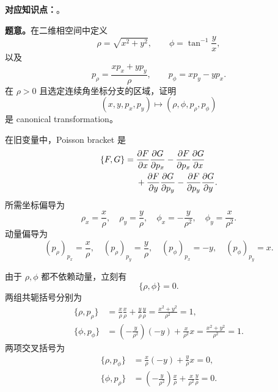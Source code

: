 \textbf{对应知识点：}。

\textbf{题意。}在二维相空间中定义
\begin{equation}
  \rho=\sqrt{x^2+y^2},
  \qquad
  \phi=\tan^{-1}\frac yx,
  \label{eq:QM-C02-S07-E02-polar-coordinates}
\end{equation}
以及
\begin{equation}
  p_\rho=\frac{xp_x+yp_y}{\rho},
  \qquad
  p_\phi=xp_y-yp_x.
  \label{eq:QM-C02-S07-E02-polar-momenta}
\end{equation}
在 $\rho>0$ 且选定连续角坐标分支的区域，证明
\[
  (x,y,p_x,p_y)
  \longmapsto
  (\rho,\phi,p_\rho,p_\phi)
\]
是 canonical transformation。

\begin{checkedsolution}
在旧变量中，Poisson bracket 是
\begin{align}
  \{F,G\}
  ={}&
  \frac{\partial F}{\partial x}
  \frac{\partial G}{\partial p_x}
  -
  \frac{\partial F}{\partial p_x}
  \frac{\partial G}{\partial x} \notag\\
  &+
  \frac{\partial F}{\partial y}
  \frac{\partial G}{\partial p_y}
  -
  \frac{\partial F}{\partial p_y}
  \frac{\partial G}{\partial y}.
  \label{eq:QM-C02-S07-E02-old-bracket}
\end{align}
所需坐标偏导为
\begin{equation}
  \rho_x=\frac x\rho,
  \quad
  \rho_y=\frac y\rho,
  \quad
  \phi_x=-\frac y{\rho^2},
  \quad
  \phi_y=\frac x{\rho^2}.
  \label{eq:QM-C02-S07-E02-coordinate-derivatives}
\end{equation}
动量偏导为
\begin{equation}
  (p_\rho)_{p_x}=\frac x\rho,
  \quad
  (p_\rho)_{p_y}=\frac y\rho,
  \quad
  (p_\phi)_{p_x}=-y,
  \quad
  (p_\phi)_{p_y}=x.
  \label{eq:QM-C02-S07-E02-momentum-derivatives}
\end{equation}

由于 $\rho,\phi$ 都不依赖动量，立刻有
\begin{equation}
  \{\rho,\phi\}=0.
  \label{eq:QM-C02-S07-E02-coordinate-bracket}
\end{equation}
两组共轭括号分别为
\begin{align}
  \{\rho,p_\rho\}
  &=\frac x\rho\frac x\rho
    +\frac y\rho\frac y\rho
    =\frac{x^2+y^2}{\rho^2}=1,
  \label{eq:QM-C02-S07-E02-radial-pair}\\
  \{\phi,p_\phi\}
  &=\left(-\frac y{\rho^2}\right)(-y)
    +\frac x{\rho^2}x
    =\frac{x^2+y^2}{\rho^2}=1.
  \label{eq:QM-C02-S07-E02-angular-pair}
\end{align}
两项交叉括号为
\begin{align}
  \{\rho,p_\phi\}
  &=\frac x\rho(-y)+\frac y\rho x=0,
  \label{eq:QM-C02-S07-E02-rho-pphi}\\
  \{\phi,p_\rho\}
  &=\left(-\frac y{\rho^2}\right)\frac x\rho
    +\frac x{\rho^2}\frac y\rho=0.
  \label{eq:QM-C02-S07-E02-phi-prho}
\end{align}


\end{checkedsolution}
